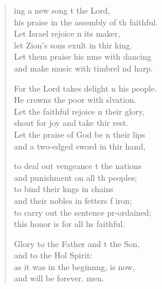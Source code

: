 \settowidth{\versewidth}{his praise in the assembly of the faithful.}
\begin{verse}%
  \begin{patverse}
    ing a new song t the Lord,\Med\\
his praise in the assembly of th faithful.\\
Let Israel rejoice \pointup{\i}n its maker,\Med\\
let Zion’s sons exult in thir king.\\
Let them praise his nme with dancing\Med\\
and make music with timbrel nd harp.

For the Lord takes delight \pointup{\i}n his people.\Med\\
He crowns the poor with slvation.\\
Let the faithful rejoice \pointup{\i}n their glory,\Med\\
shout for joy and take thir rest.\\
Let the praise of God be n their lips\Med\\
and a two-edged sword in thir hand,

to deal out vengeance t the nations\Med\\
and punishment on all th peoples;\\
to bind their k\pointup{\i}ngs in chains\Med\\
and their nobles in fetters f iron;\\
to carry out the sentence pr-ordained;\Med\\
this honor is for all h\pointup{\i}s faithful.

Glory to the Father and t the Son,\Med\\
and to the Hol Spirit:\\
as it was in the beginn\pointup{\i}ng, is now,\Med\\
and will be forever. men.
  \end{patverse}
\end{verse}
